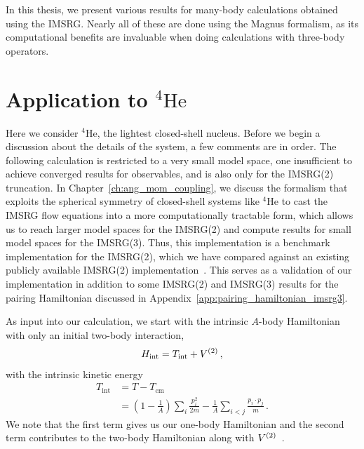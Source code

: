 In this thesis, we present various results
for many-body calculations obtained using the IMSRG.\@
Nearly all of these are done using the Magnus formalism,
as its computational benefits are invaluable when doing calculations
with three-body operators.

\section{Application to \texorpdfstring{${}^4\text{He}$}{helium 4}}\label{sec:imsrg2_he4_mscheme}

Here we consider ${}^4\text{He}$,
the lightest closed-shell nucleus.
Before we begin a discussion about the details of the system,
a few comments are in order.
The following calculation is restricted to a very small model space,
one insufficient to achieve converged results for observables,
and is also only for the IMSRG(2) truncation.
In Chapter~\ref{ch:ang_mom_coupling},
we discuss the formalism that exploits the spherical symmetry
of closed-shell systems like ${}^{4}\text{He}$
to cast the IMSRG flow equations into a more computationally tractable form,
which allows us to reach larger model spaces for the IMSRG(2)
and compute results for small model spaces for the IMSRG(3).
Thus, this implementation is a benchmark implementation for the IMSRG(2),
which we have compared against an existing publicly available IMSRG(2) implementation~\cite{Stro15imsrgcpp}.
This serves as a validation of our implementation
in addition to some IMSRG(2) and IMSRG(3) results for the pairing Hamiltonian
discussed in Appendix~\ref{app:pairing_hamiltonian_imsrg3}.

As input into our calculation, we start with the intrinsic $A$-body Hamiltonian
with only an initial two-body interaction,
\begin{equation}
  H_{\text{int}} = T_{\text{int}} + {V}^{(2)}\,,
\end{equation}
with the intrinsic kinetic energy
\begin{align}
  T_{\text{int}} & = T - T_{\text{cm}}                                          \\
                 & = \left(1 - \frac{1}{A}\right) \sum_{i} \frac{p_{i}^{2}}{2m}
  - \frac{1}{A}\sum_{i<j}\frac{p_{i} \cdot p_{j}}{m}\,.
\end{align}
We note that the first term gives us our one-body Hamiltonian
and the second term contributes to the two-body Hamiltonian along with ${V}^{(2)}$~\cite{Herg09intrinsicham}.

